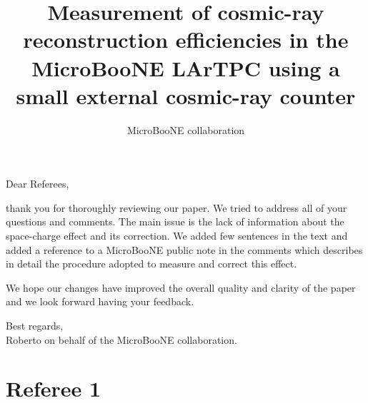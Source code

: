 \documentclass[review,number,sort&compress]{article}
\title{Measurement of cosmic-ray reconstruction efficiencies in the MicroBooNE LArTPC using a small external cosmic-ray counter}
\author{MicroBooNE collaboration}
\begin{document}
\maketitle

\noindent Dear Referees,

thank you for thoroughly reviewing our paper. We tried to address all of your questions and comments. The main issue is the lack of information about the space-charge effect and its correction. We added few sentences in the text and added a reference to a MicroBooNE public note in the comments which describes in detail the procedure adopted to measure and correct this effect.

We hope our changes have improved the overall quality and clarity of the paper and we look forward having your feedback. 

\noindent Best regards,\\
\indent Roberto on behalf of the MicroBooNE collaboration.


\section{\bf Referee 1}
\end{document}
